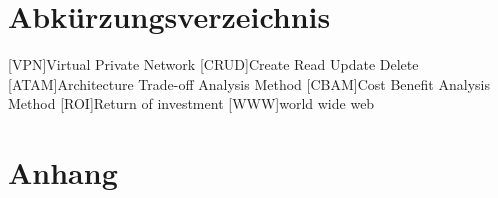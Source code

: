 \documentclass[Master,MSE,german]{twbook}
\newcommand{\listofcode}{\phantomsection\lstlistoflistings}
\begin{document}
\clearpage


\clearpage

\listoffigures
\clearpage

\listoftables
\clearpage

\listofcode
\clearpage

{}
\chapter*{Abkürzungsverzeichnis}
\begin{acronym}[XXXXX]
    [VPN]{Virtual Private Network}
    [CRUD]{Create Read Update Delete}
    [ATAM]{Architecture Trade-off Analysis Method}
    [CBAM]{Cost Benefit Analysis Method}
    [ROI]{Return of investment}
    [WWW]{world wide web}
\end{acronym}
\clearpage

{}
\chapter*{Anhang}
\end{document}
